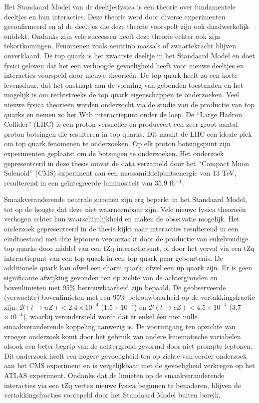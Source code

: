 \chapterprecishere{\Titledutch}
Het Standaard Model van de deeltjesfysica is een theorie over fundamentele deeltjes en hun interacties. Deze theorie werd door diverse experimenten geconfirmeerd en al de deeltjes die deze theorie voorspelt zijn ook daadwerkelijk ontdekt. Ondanks zijn vele successen heeft deze theorie echter ook zijn tekortkomingen. Fenomenen zoals neutrino massa's of zwaartekracht blijven onverklaard. De top quark is het zwaarste deeltje in het Standaard Model en doet fysici geloven dat het een verhoogde gevoeligheid heeft voor nieuwe deeltjes en interacties voorspeld door nieuwe theorie\"en. De top quark heeft zo een korte levensduur, dat het onstnapt aan de vorming van gebonden toestanden en het mogelijk is om rechtstreeks de top quark eigenschappen te onderzoeken. 
Veel nieuwe fysica theorie\"en worden onderzocht  via de studie van de productie van top quarks en nemen zo het Wtb interactiepunt onder de loep. De  ``Large Hadron Collider'' (LHC) is een proton versneller en produceert een zeer groot aantal proton botsingen die resulteren in top quarks.  Dit maakt de LHC een ideale plek om top quark fenomenen te onderzoeken. Op elk proton 
botsingspunt zijn experimenten geplaatst om de botsingen te onderzoeken.  Het onderzoek gepresenteerd in deze thesis omvat de data verzameld door het ``Compact Muon Solenoid'' (CMS) experiment aan een massamiddelpuntsenergie van  13 TeV, resulterend in een ge\"integreerde luminositeit van 35.9 fb$^{-1}$. 


Smaakveranderende neutrale stromen zijn erg beperkt in het Standaard Model, tot op de hoogte dat deze niet waarneembaar zijn. Vele nieuwe fysica theorie\"en verhogen echter hun waarschijnlijkheid en maken de observatie mogelijk. Het onderzoek gepresenteerd in de thesis kijkt naar interacties resulterend in een eindtoestand met drie leptonen veroorzaakt door de productie van enkelvoudige top quarks door middel van een tZq interactiepunt, of door het verval via een tZq interactiepunt van een top quark in een top quark paar gebeurtenis. De additionele quark kan ofwel een charm quark, ofwel een up quark zijn. Er is geen significante afwijking gevonden ten op zichte van de achtergronden en bovenlimieten met 95\% betrouwbaarheid zijn bepaald. De geobserveerde (verwachte) bovenlimieten met een 95$\%$ betrouwbaarheid op de vertakkingsfractie zijn: ${\mathcal{B}}(t \rightarrow uZ) < 2.4\times 10^{-4}$ ($1.5\times 10^{-4}$) en ${\mathcal{B}}(t \rightarrow cZ) < 4.5\times 10^{-4}$ (3.7$\times 10^{-4}$), waarbij verondersteld wordt dat er enkel \'e\'en niet nulle smaakveranderende koppeling aanwezig is. \newpage
\thispagestyle{empty}
De vooruitgang ten opzichte van vroeger onderzoek komt door het gebruik van andere kinematische variabelen alsook  een beter begrip van de achtergrond gevormd door niet prompte leptonen.  Dit onderzoek heeft een  hogere gevoeligheid ten op zichte van eerder onderzoek aan het CMS experiment en is vergelijkbaar met de gevoeligheid verkregen op het ATLAS experiment. Ondanks dat 
de limieten op de smaakveranderende interacties via een tZq vertex nieuwe fysica beginnen te benaderen, blijven de vertakkingsfracties voorspeld door het Standaard Model buiten bereik. 
